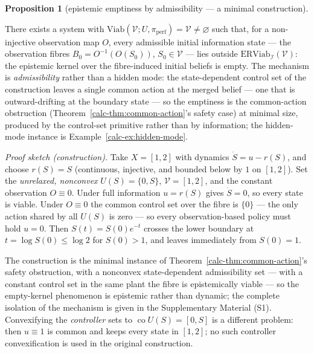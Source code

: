 \documentclass[10pt,twocolumn]{article}
\theoremstyle{definition}
\newtheorem{proposition}{Proposition}
\begin{document}
\begin{proposition}[epistemic emptiness by admissibility --- a minimal construction]\label{calc-prop:emptiness}

There exists a system with
\(\mathrm{Viab}(\mathcal{V}; U, \pi_{\mathrm{perf}}) = \mathcal{V} \neq \varnothing\)
such that, for a non-injective observation map \(O\), every admissible
initial information state --- the observation fibres
\(B_0 = O^{-1}(O(S_0))\), \(S_0 \in \mathcal{V}\) --- lies outside
\(\mathrm{ERViab}_{\mathcal{I}}(\mathcal{V})\): the epistemic kernel
over the fibre-induced initial beliefs is empty. The mechanism is \emph{admissibility} rather than a hidden mode: the
state-dependent control set of the construction leaves a single common
action at the merged belief --- one that is outward-drifting at the
boundary state --- so the emptiness is the common-action obstruction
(Theorem~\ref{calc-thm:common-action}'s safety case) at minimal size, produced by the control-set primitive rather than by information; the
hidden-mode instance is Example~\ref{calc-ex:hidden-mode}.

\end{proposition}

\emph{Proof sketch (construction).} Take \(X = [1,2]\) with dynamics \(\dot S = u - r(S)\), and choose \(r(S)=S\) (continuous, injective, and bounded below by \(1\) on \([1,2]\)). Set the \emph{unrelaxed, nonconvex} \(U(S) = \{0, S\}\), \(\mathcal{V} = [1,2]\), and the constant observation \(O \equiv 0\). Under full information \(u = r(S)\) gives \(\dot S = 0\), so every state is viable. Under \(O \equiv 0\) the common control set over the fibre is \(\{0\}\) --- the only action shared by all \(U(S)\) is zero --- so every observation-based policy must hold \(u=0\). Then \(S(t)=S(0)e^{-t}\) crosses the lower boundary at \(t=\log S(0)\le\log 2\) for \(S(0)>1\), and leaves immediately from \(S(0)=1\).

The construction is the minimal instance of Theorem~\ref{calc-thm:common-action}'s safety obstruction, with a nonconvex state-dependent admissibility set --- with a constant control set in the same plant the fibre is epistemically viable --- so the empty-kernel phenomenon is epistemic rather than dynamic; the complete isolation of the mechanism is given in the Supplementary Material (S1). Convexifying the \emph{controller} sets to \(\operatorname{co}U(S)=[0,S]\) is a different problem: then \(u\equiv1\) is common and keeps every state in \([1,2]\); no such controller convexification is used in the original construction.
\end{document}

